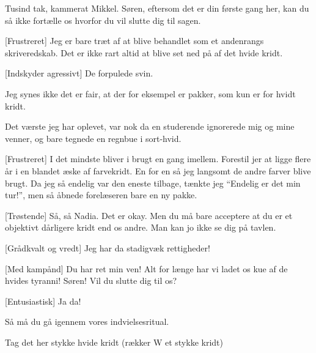 \documentclass[a4paper,11pt]{article}
\begin{document}
\begin{sketch}

 Tusind tak, kammerat Mikkel. Søren, eftersom det er din første gang her, kan du så ikke fortælle os hvorfor du vil slutte dig til sagen.

[Frustreret] Jeg er bare træt af at blive behandlet som et andenrangs skriveredskab. Det er ikke rart altid at blive set ned på af det hvide kridt.

[Indskyder agressivt] De forpulede svin.

 Jeg synes ikke det er fair, at der for eksempel er pakker, som kun er for hvidt kridt.

 Det værste jeg har oplevet, var nok da en studerende ignorerede mig og mine venner, og bare tegnede en regnbue i sort-hvid.

[Frustreret] I det mindste bliver i brugt en gang imellem.  Forestil jer at ligge flere år i en blandet æske af farvekridt. En for en så jeg langsomt de andre farver blive brugt. Da jeg så endelig var den eneste tilbage, tænkte jeg  “Endelig er det min tur!”,  men så åbnede forelæseren bare en ny pakke. 

[Trøstende] Så, så Nadia. Det er okay. Men du må bare acceptere at du er et objektivt dårligere kridt end os andre. Man kan jo ikke se dig på tavlen.

[Grådkvalt og vredt] Jeg har da stadigvæk rettigheder!

[Med kampånd] Du har ret min ven! Alt for længe har vi ladet os kue af de hvides tyranni! %
Søren! Vil du slutte dig til os?



[Entusiastisk] Ja da!

 Så må du gå igennem vores indvielsesritual. 

 Tag det her stykke hvide kridt (rækker W et stykke kridt)


\end{sketch}
\end{document}

